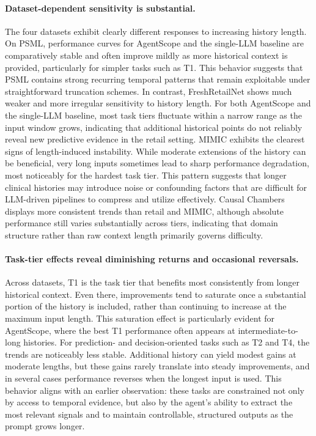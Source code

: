 \paragraph{Dataset-dependent sensitivity is substantial.}
The four datasets exhibit clearly different responses to increasing history length.
On PSML, performance curves for AgentScope and the single-LLM baseline are comparatively stable and often improve mildly as more historical context is provided, particularly for simpler tasks such as T1.
This behavior suggests that PSML contains strong recurring temporal patterns that remain exploitable under straightforward truncation schemes.
In contrast, FreshRetailNet shows much weaker and more irregular sensitivity to history length.
For both AgentScope and the single-LLM baseline, most task tiers fluctuate within a narrow range as the input window grows, indicating that additional historical points do not reliably reveal new predictive evidence in the retail setting.
MIMIC exhibits the clearest signs of length-induced instability.
While moderate extensions of the history can be beneficial, very long inputs sometimes lead to sharp performance degradation, most noticeably for the hardest task tier.
This pattern suggests that longer clinical histories may introduce noise or confounding factors that are difficult for LLM-driven pipelines to compress and utilize effectively.
Causal Chambers displays more consistent trends than retail and MIMIC, although absolute performance still varies substantially across tiers, indicating that domain structure rather than raw context length primarily governs difficulty.

\paragraph{Task-tier effects reveal diminishing returns and occasional reversals.}
Across datasets, T1 is the task tier that benefits most consistently from longer historical context.
Even there, improvements tend to saturate once a substantial portion of the history is included, rather than continuing to increase at the maximum input length.
This saturation effect is particularly evident for AgentScope, where the best T1 performance often appears at intermediate-to-long histories.
For prediction- and decision-oriented tasks such as T2 and T4, the trends are noticeably less stable.
Additional history can yield modest gains at moderate lengths, but these gains rarely translate into steady improvements, and in several cases performance reverses when the longest input is used.
This behavior aligns with an earlier observation: these tasks are constrained not only by access to temporal evidence, but also by the agent’s ability to extract the most relevant signals and to maintain controllable, structured outputs as the prompt grows longer.

